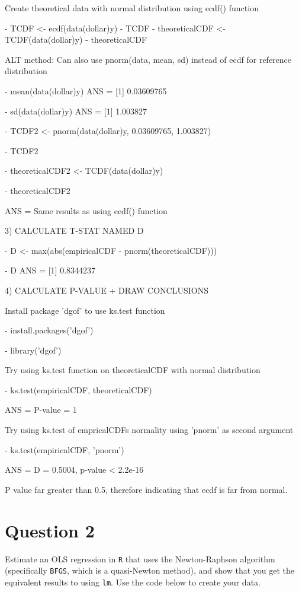 \documentclass[12pt,letterpaper]{article}
\begin{document}
Create theoretical data with normal distribution using ecdf() function 

	- TCDF <- ecdf(data(dollar)y)
	- TCDF
	- theoreticalCDF <- TCDF(data(dollar)y)
	- theoreticalCDF

ALT method: Can also use pnorm(data, mean, sd) instead of ecdf for reference distribution

	- mean(data(dollar)y) ANS = [1] 0.03609765
	
	- sd(data(dollar)y) ANS = [1] 1.003827

	- TCDF2 <- pnorm(data(dollar)y, 0.03609765, 1.003827)

	- TCDF2

	- theoreticalCDF2 <- TCDF(data(dollar)y)

	- theoreticalCDF2 
	
	ANS = Same results as using ecdf() function 
\vspace{1cm}

3) CALCULATE T-STAT NAMED D

	- D <- max(abs(empiricalCDF - pnorm(theoreticalCDF)))
	
	- D 
 ANS = [1] 0.8344237
\vspace{1cm}

4) CALCULATE P-VALUE + DRAW CONCLUSIONS

Install package 'dgof' to use ks.test function

	- install.packages('dgof')

	- library('dgof')

Try using ks.test function on theoreticalCDF with normal distribution

	- ks.test(empiricalCDF, theoreticalCDF)
	
ANS = P-value = 1

Try using ks.test of empricalCDFs normality using 'pnorm' as second argument
	
	- ks.test(empiricalCDF, 'pnorm') 
	
	ANS = D = 0.5004, p-value < 2.2e-16

P value far greater than 0.5, therefore indicating that ecdf is far from normal. 
\vspace{1cm}

\section*{Question 2}%
\noindent Estimate an OLS regression in \texttt{R} that uses the Newton-Raphson algorithm (specifically \texttt{BFGS}, which is a quasi-Newton method), and show that you get the equivalent results to using \texttt{lm}. Use the code below to create your data.
\vspace{.5cm}
\end{document}
